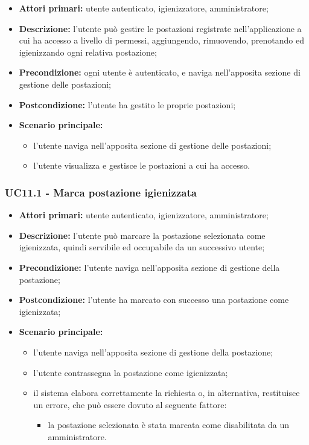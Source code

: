 \begin{itemize}
\item \textbf{Attori primari:} utente autenticato, igienizzatore, amministratore;
\item \textbf{Descrizione:} l’utente può gestire le postazioni registrate nell’applicazione a cui ha accesso a livello di permessi, aggiungendo, rimuovendo, prenotando ed igienizzando ogni relativa postazione;
\item \textbf{Precondizione:} ogni utente è autenticato, e naviga nell’apposita sezione di gestione delle postazioni;
\item \textbf{Postcondizione:} l’utente ha gestito le proprie postazioni;
\item \textbf{Scenario principale:} 
	\begin{itemize}
		\item l’utente naviga nell’apposita sezione di gestione delle postazioni;
		\item l’utente visualizza e gestisce le postazioni a cui ha accesso.
	\end{itemize}
\end{itemize}

\subsubsection{UC11.1 - Marca postazione igienizzata}

\begin{itemize}
\item \textbf{Attori primari:} utente autenticato, igienizzatore, amministratore;
\item \textbf{Descrizione:} l’utente può marcare la postazione selezionata come igienizzata, quindi servibile ed occupabile da un successivo utente;
\item \textbf{Precondizione:} l’utente naviga nell’apposita sezione di gestione della postazione; 
\item \textbf{Postcondizione:} l’utente ha marcato con successo una postazione come igienizzata;
\item \textbf{Scenario principale:} 
	\begin{itemize}
		\item l’utente naviga nell’apposita sezione di gestione della postazione;		
		\item l’utente contrassegna la postazione come igienizzata;
		\item il sistema elabora correttamente la richiesta o, in alternativa, restituisce un errore, che può essere dovuto al seguente fattore:
		\begin{itemize}
			\item la postazione selezionata è stata marcata come disabilitata da un amministratore.
		\end{itemize}
	\end{itemize}
\end{itemize}

